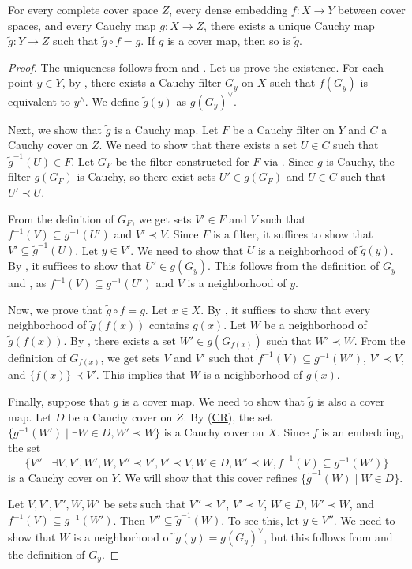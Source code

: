 \documentclass[reqno]{amsart}
\newcommand{\axref}[1]{(\hyperref[ax:#1]{#1})}
\theoremstyle{definition}
\theoremstyle{remark}
\numberwithin{figure}{section}
\newcommand{\rb}{\prec}
\begin{document}
\begin{thm}
For every complete cover space $Z$, every dense embedding $f : X \to Y$ between cover spaces, and every Cauchy map $g : X \to Z$,
there exists a unique Cauchy map $\widetilde{g} : Y \to Z$ such that $\widetilde{g} \circ f = g$.
If $g$ is a cover map, then so is $\widetilde{g}$.
\end{thm}
\begin{proof}
The uniqueness follows from  and .
Let us prove the existence.
For each point $y \in Y$, by , there exists a Cauchy filter $G_y$ on $X$ such that $f(G_y)$ is equivalent to $y^\wedge$.
We define $\widetilde{g}(y)$ as $g(G_y)^\vee$.

Next, we show that $\widetilde{g}$ is a Cauchy map.
Let $F$ be a Cauchy filter on $Y$ and $C$ a Cauchy cover on $Z$.
We need to show that there exists a set $U \in C$ such that $\widetilde{g}^{-1}(U) \in F$.
Let $G_F$ be the filter constructed for $F$ via .
Since $g$ is Cauchy, the filter $g(G_F)$ is Cauchy, so there exist sets $U' \in g(G_F)$ and $U \in C$ such that $U' \rb U$.

From the definition of $G_F$, we get sets $V' \in F$ and $V$ such that $f^{-1}(V) \subseteq g^{-1}(U')$ and $V' \rb V$.
Since $F$ is a filter, it suffices to show that $V' \subseteq \widetilde{g}^{-1}(U)$.
Let $y \in V'$.
We need to show that $U$ is a neighborhood of $\widetilde{g}(y)$.
By , it suffices to show that $U' \in g(G_y)$.
This follows from the definition of $G_y$ and , as $f^{-1}(V) \subseteq g^{-1}(U')$ and $V$ is a neighborhood of $y$.

Now, we prove that $\widetilde{g} \circ f = g$.
Let $x \in X$.
By , it suffices to show that every neighborhood of $\widetilde{g}(f(x))$ contains $g(x)$.
Let $W$ be a neighborhood of $\widetilde{g}(f(x))$.
By , there exists a set $W' \in g(G_{f(x)})$ such that $W' \rb W$.
From the definition of $G_{f(x)}$, we get sets $V$ and $V'$ such that $f^{-1}(V) \subseteq g^{-1}(W')$, $V' \rb V$, and $\{ f(x) \} \rb V'$.
This implies that $W$ is a neighborhood of $g(x)$.

Finally, suppose that $g$ is a cover map.
We need to show that $\widetilde{g}$ is also a cover map.
Let $D$ be a Cauchy cover on $Z$.
By \axref{CR}, the set $\{ g^{-1}(W') \mid \exists W \in D, W' \rb W \}$ is a Cauchy cover on $X$.
Since $f$ is an embedding, the set
\[ \{ V'' \mid \exists V,V',W',W, V'' \rb V', V' \rb V, W \in D, W' \rb W, f^{-1}(V) \subseteq g^{-1}(W') \} \]
is a Cauchy cover on $Y$.
We will show that this cover refines $\{ \widetilde{g}^{-1}(W) \mid W \in D \}$.

Let $V,V',V'',W,W'$ be sets such that $V'' \rb V'$, $V' \rb V$, $W \in D$, $W' \rb W$, and $f^{-1}(V) \subseteq g^{-1}(W')$.
Then $V'' \subseteq \widetilde{g}^{-1}(W)$.
To see this, let $y \in V''$.
We need to show that $W$ is a neighborhood of $\widetilde{g}(y) = g(G_y)^\vee$, but this follows from  and the definition of $G_y$.
\end{proof}
\end{document}
